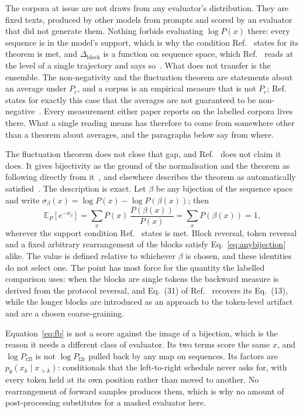\documentclass[11pt]{article}
\newcommand{\Dblock}{\Delta_{\mathrm{block}}}
\begin{document}
The corpora at issue are not draws from any evaluator's distribution.
They are fixed texts, produced
by other models from prompts and scored by an evaluator that did not
generate them.  Nothing forbids evaluating $\log P(x)$ there: every sequence
is in the model's support, which is why the condition
Ref.~\cite{sagawa2026} states for its theorem is met, and $\Dblock$ is a
function on
sequence space, which Ref.~\cite{sagawa2026} reads at the level of a single
trajectory and says so~\cite[Sec.~V~B]{sagawa2026}.  What does not transfer
is the ensemble.  The non-negativity and the fluctuation theorem are
statements about an average under $P_c$, and a corpus is an empirical
measure that is not $P_c$; Ref.~\cite{sagawa2026} states for exactly this
case that the averages are not guaranteed to be
non-negative~\cite[Fig.~4]{sagawa2026}.  Every measurement either paper
reports on the labelled corpora lives there.  What a single reading means
has therefore to come from somewhere other than a theorem about averages,
and the paragraphs below say from where.

The fluctuation theorem does not close that gap, and
Ref.~\cite{sagawa2026} does not claim it does.  It gives bijectivity as the
ground of the normalisation and the theorem as following directly from
it~\cite[Eq.~(33)]{sagawa2026}, and elsewhere describes the theorem as
automatically satisfied~\cite[Eq.~(19)]{sagawa2026}.  The description is
exact.  Let $\beta$ be any bijection of the sequence space and write
$\sigma_\beta(x) = \log P(x) - \log P(\beta(x))$; then
\begin{equation}
\mathbb{E}_{P}\!\left[e^{-\sigma_\beta}\right]
  = \sum_x P(x)\,\frac{P(\beta(x))}{P(x)}
  = \sum_x P(\beta(x)) = 1 ,
\label{eq:anybijection}
\end{equation}
wherever the support condition Ref.~\cite{sagawa2026} states is met.  Block
reversal, token reversal and a fixed arbitrary rearrangement of the blocks
satisfy Eq.~\eqref{eq:anybijection} alike.  The value is defined relative to
whichever $\beta$ is chosen, and these identities do not select one.  The
point has most force for the quantity the labelled comparison uses: when the blocks are single tokens the backward measure is derived from the
protocol
reversal, and Eq.~(31) of Ref.~\cite{sagawa2026} recovers its
Eq.~(13), while the longer blocks are introduced as an approach to the
token-level artifact and are a chosen coarse-graining.

Equation~\eqref{eq:fb} is not a score against the image of a bijection,
which is the reason it needs a different class of evaluator.  Its two terms score the same $x$, and
$\log P_{\mathrm{r2l}}$ is not $\log P_{\mathrm{l2r}}$ pulled back by any map
on sequences.  Its factors are $p_\theta(x_k \mid x_{>k})$: conditionals that
the left-to-right schedule never asks for, with every token held at its own
position rather than moved to another.  No rearrangement of forward samples
produces them, which is why no amount of post-processing substitutes for a
masked evaluator here.
\end{document}
